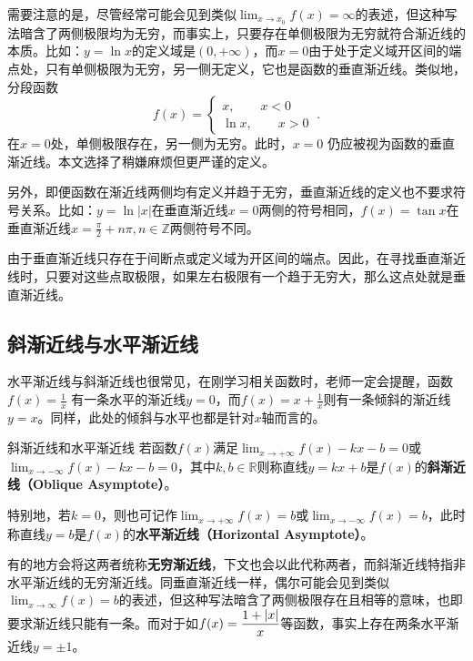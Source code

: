 需要注意的是，尽管经常可能会见到类似$\displaystyle \lim_{x\to x_0}f(x)=\infty$的表述，但这种写法暗含了两侧极限均为无穷，而事实上，只要存在单侧极限为无穷就符合渐近线的本质。比如：$y=\ln x$的定义域是$(0,+\infty)$，而$x=0$由于处于定义域开区间的端点处，只有单侧极限为无穷，另一侧无定义，它也是函数的垂直渐近线。类似地，分段函数
\begin{equation}
f(x)=\begin{cases}
x,\qquad x<0\\
\ln x,\qquad x>0
\end{cases}~.
\end{equation}
在$x=0$处，单侧极限存在，另一侧为无穷。此时，$x = 0$ 仍应被视为函数的垂直渐近线。本文选择了稍嫌麻烦但更严谨的定义。

另外，即便函数在渐近线两侧均有定义并趋于无穷，垂直渐近线的定义也不要求符号关系。比如：$y=\ln |x|$在垂直渐近线$x=0$两侧的符号相同，$f(x)=\tan x$在垂直渐近线$\displaystyle x = \frac{\pi}{2} + n\pi,n \in \mathbb{Z}$两侧符号不同。

由于垂直渐近线只存在于间断点或定义域为开区间的端点。因此，在寻找垂直渐近线时，只要对这些点取极限，如果左右极限有一个趋于无穷大，那么这点处就是垂直渐近线。

\subsection{斜渐近线与水平渐近线}

水平渐近线与斜渐近线也很常见，在刚学习相关函数时，老师一定会提醒，函数 $\displaystyle f(x) = \frac{1}{x}$ 有一条水平的渐近线$y = 0$，而$f(x) = x + \frac{1}{x}$则有一条倾斜的渐近线$y = x$。同样，此处的倾斜与水平也都是针对$x$轴而言的。

\begin{definition}{斜渐近线和水平渐近线}
若函数$f(x)$满足$\displaystyle \lim_{x\to +\infty}f(x)-kx-b=0$或$\displaystyle \lim_{x\to -\infty}f(x)-kx-b=0$，其中$k,b\in\mathbb{R}$则称直线$y=kx+b$是$f(x)$的\textbf{斜渐近线（Oblique Asymptote）}。

特别地，若$k=0$，则也可记作$\displaystyle \lim_{x\to +\infty}f(x)=b$或$\displaystyle \lim_{x\to -\infty}f(x)=b$，此时称直线$y=b$是$f(x)$的\textbf{水平渐近线（Horizontal Asymptote）}。
\end{definition}

有的地方会将这两者统称\textbf{无穷渐近线}，下文也会以此代称两者，而斜渐近线特指非水平渐近线的无穷渐近线。同垂直渐近线一样，偶尔可能会见到类似$\displaystyle \lim_{x\to \infty}f(x)=b$的表述，但这种写法暗含了两侧极限存在且相等的意味，也即要求渐近线只能有一条。而对于如$\displaystyle f(x)={1+|x|\over x}$等函数，事实上存在两条水平渐近线$y=\pm1$。


